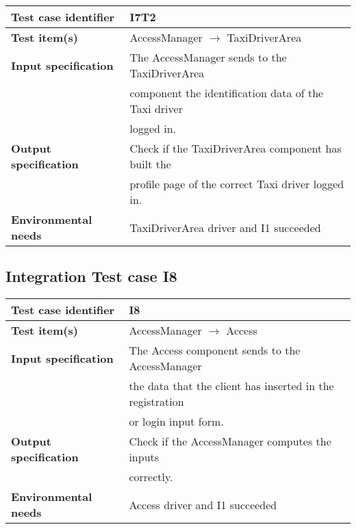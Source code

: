 		\vspace{1cm}
		\noindent
		\begin{adjustbox}{max width=\textwidth}
			\begin{tabular}{ l l}
				\hline 		\textbf{Test case identifier} & I7T2 \\
				\hline		\textbf{Test item(s)}  & AccessManager $\rightarrow$ TaxiDriverArea \\
				\hline		\textbf{Input specification} & The AccessManager sends to the TaxiDriverArea \\ & component the identification data of the Taxi driver\\ & logged in.\\
				\hline		\textbf{Output specification} & Check if the TaxiDriverArea component has built the\\ & profile page of the correct Taxi driver logged in.\\
				\hline		\textbf{Environmental needs} & TaxiDriverArea driver and I1 succeeded\\
				\hline
			\end{tabular}
		\end{adjustbox}
	
	\hypertarget{chapter 3.8}{ }
	\subsection{Integration Test case I8}
		\begin{adjustbox}{max width=\textwidth}
			\begin{tabular}{ l l}
				\hline 		\textbf{Test case identifier} & I8 \\
				\hline		\textbf{Test item(s)}  & AccessManager $\rightarrow$ Access \\
				\hline		\textbf{Input specification} & The Access component sends to the AccessManager \\ & the data that the client has inserted in the registration \\ & or login input form.\\
				\hline		\textbf{Output specification} & Check if the AccessManager computes the inputs\\ & correctly.\\
				\hline		\textbf{Environmental needs} & Access driver and I1 succeeded\\
				\hline
			\end{tabular}
		\end{adjustbox}
	
	\hypertarget{chapter 3.9}{ }
